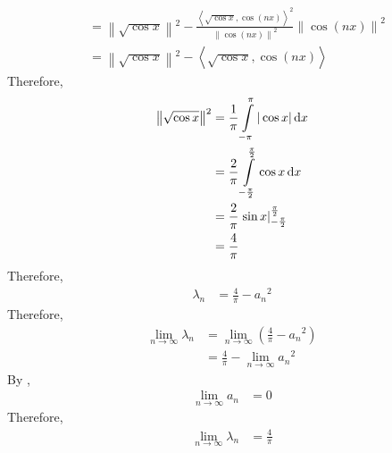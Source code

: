 \documentclass[fleqn, a4paper, 12pt, twoside]{article}
\theoremstyle{definition}
\theoremstyle{theorem}
\begin{document}
\begin{solution}
\begin{align*}
                          & = \left\| \sqrt{\cos x} \right\|^2 - \frac{\left\langle \sqrt{\cos x},\cos(n x) \right\rangle^2}{\left\| \cos(n x) \right\|^2} \left\| \cos(n x) \right\|^2 \\
                          & = \left\| \sqrt{\cos x} \right\|^2 - \left\langle \sqrt{\cos x},\cos(n x) \right\rangle
	\end{align*}
	Therefore,
	\begin{align*}
		\left\| \sqrt{\cos x} \right\|^2 & = \frac{1}{\pi} \int\limits_{-\pi}^{\pi} |\cos x| \dif x                   \\
                                                 & = \frac{2}{\pi} \int\limits_{-\frac{\pi}{2}}^{\frac{\pi}{2}} \cos x \dif x \\
                                                 & = \frac{2}{\pi} \left. \sin x \right|_{-\frac{\pi}{2}}^{\frac{\pi}{2}}     \\
                                                 & = \frac{4}{\pi}
	\end{align*}
	Therefore,
	\begin{align*}
		\lambda_n & = \frac{4}{\pi} - {a_n}^2
	\end{align*}
	Therefore,
	\begin{align*}
		\lim\limits_{n \to \infty} \lambda_n & = \lim\limits_{n \to \infty} \left( \frac{4}{\pi} - {a_n}^2 \right) \\
                                                     & = \frac{4}{\pi} - \lim\limits_{n \to \infty} {a_n}^2
	\end{align*}
	By ,
	\begin{align*}
		\lim\limits_{n \to \infty} a_n & = 0
	\end{align*}
	Therefore,
	\begin{align*}
		\lim\limits_{n \to \infty} \lambda_n & = \frac{4}{\pi}
	\end{align*}
\end{solution}
\end{document}
